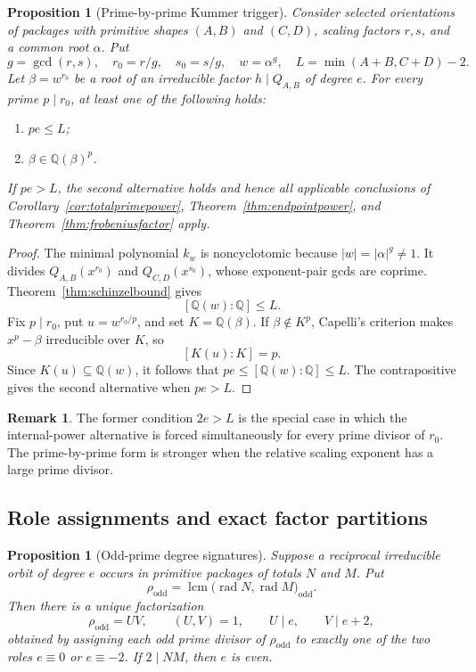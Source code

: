 \documentclass[11pt]{article}
\newtheorem{proposition}[theorem]{Proposition}
\theoremstyle{definition}
\newtheorem{remark}[theorem]{Remark}
\newcommand{\Q}{\mathbb Q}
\begin{document}
\begin{proposition}[Prime-by-prime Kummer trigger]
\label{prop:largetrigger}
Consider selected orientations of packages with primitive shapes \((A,B)\)
and \((C,D)\), scaling factors \(r,s\), and a common root \(\alpha\).  Put
\[
 g=\gcd(r,s),\quad r_0=r/g,\quad s_0=s/g,
 \quad w=\alpha^g,
 \quad L=\min(A+B,C+D)-2.
\]
Let \(\beta=w^{r_0}\) be a root of an irreducible factor
\(h\mid Q_{A,B}\) of degree \(e\).  For every prime \(p\mid r_0\), at
least one of the following holds:
\begin{enumerate}[label=(\roman*)]
\item \(pe\leq L\);
\item \(\beta\in\Q(\beta)^p\).
\end{enumerate}
If \(pe>L\), the second alternative holds and hence all applicable
conclusions of Corollary~\ref{cor:totalprimepower},
Theorem~\ref{thm:endpointpower}, and
Theorem~\ref{thm:frobeniusfactor} apply.
\end{proposition}

\begin{proof}
The minimal polynomial \(k_w\) is noncyclotomic because
\(|w|=|\alpha|^g\neq1\).  It divides
\(Q_{A,B}(x^{r_0})\) and \(Q_{C,D}(x^{s_0})\), whose exponent-pair gcds
are coprime.  Theorem~\ref{thm:schinzelbound} gives
\[
 [\Q(w):\Q]\leq L.
\]
Fix \(p\mid r_0\), put \(u=w^{r_0/p}\), and set
\(K=\Q(\beta)\).  If \(\beta\notin K^p\), Capelli's criterion makes
\(x^p-\beta\) irreducible over \(K\), so
\[
 [K(u):K]=p.
\]
Since \(K(u)\subseteq\Q(w)\), it follows that
\(pe\leq[\Q(w):\Q]\leq L\).  The contrapositive gives the second
alternative when \(pe>L\).
\end{proof}

\begin{remark}
The former condition \(2e>L\) is the special case in which the
internal-power alternative is forced simultaneously for every prime divisor
of \(r_0\).  The prime-by-prime form is stronger when the relative scaling
exponent has a large prime divisor.
\end{remark}

\subsection{Role assignments and exact factor partitions}

\begin{proposition}[Odd-prime degree signatures]
\label{prop:rolesignature}
Suppose a reciprocal irreducible orbit of degree \(e\) occurs in primitive
packages of totals \(N\) and \(M\).  Put
\[
 \rho_{\mathrm{odd}}
 =\operatorname{lcm}\bigl(\operatorname{rad}N,
                           \operatorname{rad}M\bigr)_{\mathrm{odd}}.
\]
Then there is a unique factorization
\begin{equation}
 \rho_{\mathrm{odd}}=UV,
 \qquad (U,V)=1,
 \qquad U\mid e,
 \qquad V\mid e+2,
 \tag{15.7}
\end{equation}
obtained by assigning each odd prime divisor of \(\rho_{\mathrm{odd}}\) to
exactly one of the two roles \(e\equiv0\) or \(e\equiv-2\).  If
\(2\mid NM\), then \(e\) is even.
\end{proposition}
\end{document}
